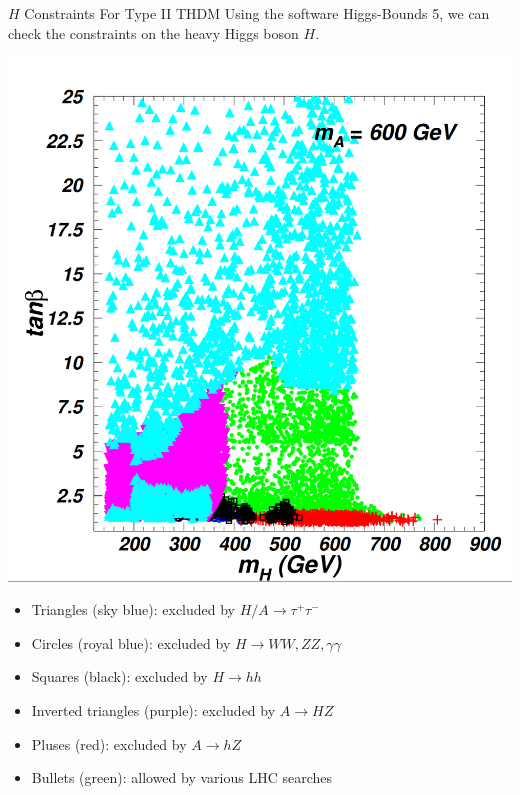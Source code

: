 \documentclass{../bredelebeamer}
\begin{document}
\begin{frame}{$H$ Constraints For Type II THDM}
    Using the software Higgs-Bounds 5, we can check the constraints on the heavy Higgs boson $H$. 

    \begin{minipage}{0.48\textwidth}
        \includegraphics[width=\textwidth]{HH_Constraints.png}
    \end{minipage}\hfill
\begin{minipage}{0.48\textwidth}
    \begin{itemize}
        \item Triangles (sky blue): excluded by $H/A \rightarrow \tau^{+} \tau^{-}$\vfill
        \item Circles (royal blue): excluded by $H \rightarrow W W, Z Z, \gamma \gamma$\vfill
        \item Squares (black): excluded by $H \rightarrow h h$\vfill
        \item Inverted triangles (purple): excluded by $A \rightarrow H Z$\vfill
        \item Pluses (red): excluded by $A \rightarrow h Z$\vfill
        \item Bullets (green): allowed by various LHC searches
        \end{itemize}
    \end{minipage}
\end{frame}
\end{document}
